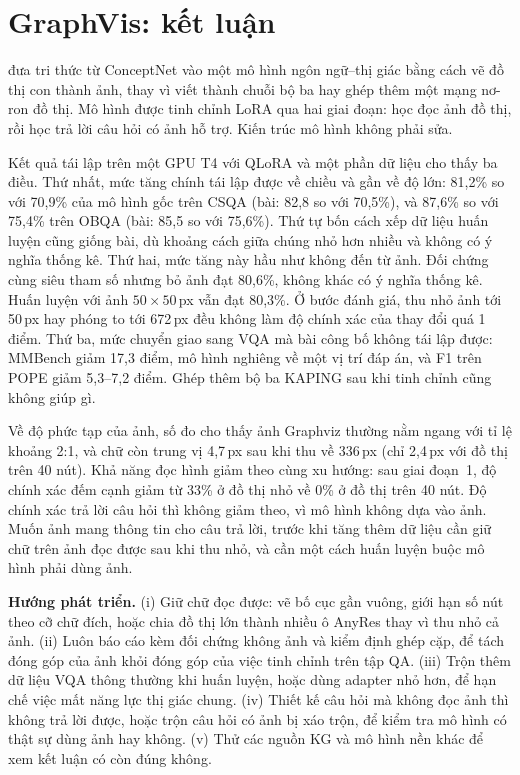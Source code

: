 \section{GraphVis: kết luận}\label{sec:gv-conclusion}
\GV{} đưa tri thức từ ConceptNet vào một mô hình ngôn ngữ--thị giác bằng cách vẽ đồ thị con thành ảnh, thay vì viết thành chuỗi bộ ba hay ghép thêm một mạng nơ-ron đồ thị. Mô hình được tinh chỉnh LoRA qua hai giai đoạn: học đọc ảnh đồ thị, rồi học trả lời câu hỏi có ảnh hỗ trợ. Kiến trúc mô hình không phải sửa.

Kết quả tái lập trên một GPU T4 với QLoRA và một phần dữ liệu cho thấy ba điều. Thứ nhất, mức tăng chính tái lập được về chiều và gần về độ lớn: 81,2\% so với 70,9\% của mô hình gốc trên CSQA (bài: 82,8 so với 70,5\%), và 87,6\% so với 75,4\% trên OBQA (bài: 85,5 so với 75,6\%). Thứ tự bốn cách xếp dữ liệu huấn luyện cũng giống bài, dù khoảng cách giữa chúng nhỏ hơn nhiều và không có ý nghĩa thống kê. Thứ hai, mức tăng này hầu như không đến từ ảnh. Đối chứng cùng siêu tham số nhưng bỏ ảnh đạt 80,6\%, không khác \GV{} có ý nghĩa thống kê. Huấn luyện với ảnh $50\times50$\,px vẫn đạt 80,3\%. Ở bước đánh giá, thu nhỏ ảnh tới 50\,px hay phóng to tới 672\,px đều không làm độ chính xác của \GV{} thay đổi quá 1 điểm. Thứ ba, mức chuyển giao sang VQA mà bài công bố không tái lập được: MMBench giảm 17,3 điểm, mô hình nghiêng về một vị trí đáp án, và F1 trên POPE giảm 5,3--7,2 điểm. Ghép thêm bộ ba KAPING sau khi tinh chỉnh cũng không giúp gì.

Về độ phức tạp của ảnh, số đo cho thấy ảnh Graphviz thường nằm ngang với tỉ lệ khoảng 2:1, và chữ còn trung vị 4,7\,px sau khi thu về 336\,px (chỉ 2,4\,px với đồ thị trên 40 nút). Khả năng đọc hình giảm theo cùng xu hướng: sau giai đoạn~1, độ chính xác đếm cạnh giảm từ 33\% ở đồ thị nhỏ về 0\% ở đồ thị trên 40 nút. Độ chính xác trả lời câu hỏi thì không giảm theo, vì mô hình không dựa vào ảnh. Muốn ảnh mang thông tin cho câu trả lời, trước khi tăng thêm dữ liệu cần giữ chữ trên ảnh đọc được sau khi thu nhỏ, và cần một cách huấn luyện buộc mô hình phải dùng ảnh.

\textbf{Hướng phát triển.} (i) Giữ chữ đọc được: vẽ bố cục gần vuông, giới hạn số nút theo cỡ chữ đích, hoặc chia đồ thị lớn thành nhiều ô AnyRes thay vì thu nhỏ cả ảnh. (ii) Luôn báo cáo kèm đối chứng không ảnh và kiểm định ghép cặp, để tách đóng góp của ảnh khỏi đóng góp của việc tinh chỉnh trên tập QA. (iii) Trộn thêm dữ liệu VQA thông thường khi huấn luyện, hoặc dùng adapter nhỏ hơn, để hạn chế việc mất năng lực thị giác chung. (iv) Thiết kế câu hỏi mà không đọc ảnh thì không trả lời được, hoặc trộn câu hỏi có ảnh bị xáo trộn, để kiểm tra mô hình có thật sự dùng ảnh hay không. (v) Thử các nguồn KG và mô hình nền khác để xem kết luận có còn đúng không.
